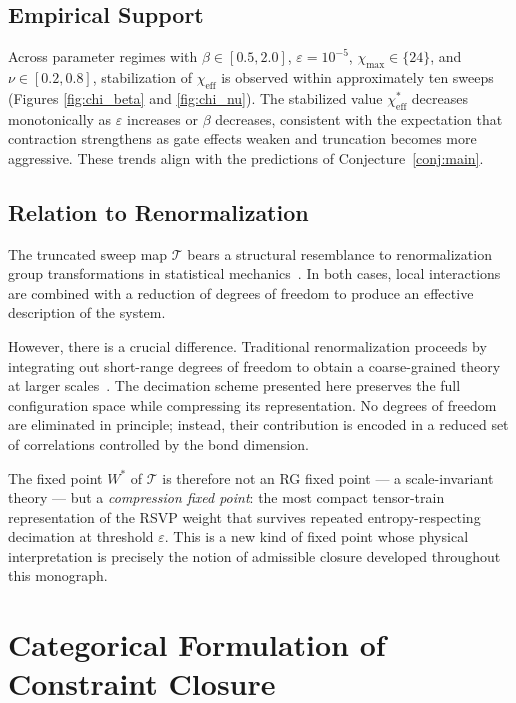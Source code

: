 \documentclass[11pt]{article}
\theoremstyle{definition}
\begin{document}
\subsection{Empirical Support}

Across parameter regimes with $\beta \in [0.5, 2.0]$, $\varepsilon = 10^{-5}$,
$\chi_{\max} \in \{24\}$, and $\nu \in [0.2, 0.8]$, stabilization of
$\chi_{\mathrm{eff}}$ is observed within approximately ten sweeps (Figures
\ref{fig:chi_beta} and \ref{fig:chi_nu}). The stabilized value
$\chi_{\mathrm{eff}}^*$ decreases monotonically as $\varepsilon$ increases
or $\beta$ decreases, consistent with the expectation that contraction
strengthens as gate effects weaken and truncation becomes more aggressive. These
trends align with the predictions of Conjecture~\ref{conj:main}.

\subsection{Relation to Renormalization}

The truncated sweep map $\mathcal{T}$ bears a structural resemblance to
renormalization group transformations in statistical
mechanics~\cite{wilson1975rg, white1992dmrg}. In both cases, local
interactions are combined with a reduction of degrees of freedom to produce an
effective description of the system.

However, there is a crucial difference. Traditional renormalization proceeds
by integrating out short-range degrees of freedom to obtain a coarse-grained
theory at larger scales~\cite{wilson1975rg}. The decimation scheme presented
here preserves the full configuration space while compressing its
representation. No degrees of freedom are eliminated in principle; instead,
their contribution is encoded in a reduced set of correlations controlled by
the bond dimension.

The fixed point $W^*$ of $\mathcal{T}$ is therefore not an RG fixed point
--- a scale-invariant theory --- but a \emph{compression fixed point}: the most
compact tensor-train representation of the RSVP weight that survives repeated
entropy-respecting decimation at threshold $\varepsilon$. This is a new kind of
fixed point whose physical interpretation is precisely the notion of admissible
closure developed throughout this monograph.

\section{Categorical Formulation of Constraint Closure}
\end{document}
